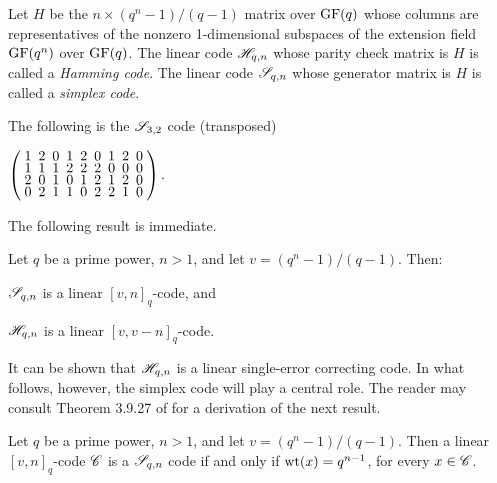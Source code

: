 \documentclass[../../../main]{subfiles}
\begin{document}
\begin{defin}\label{hamming-code}\label{hamming-simplex-def}
  Let $H$ be the $n \times (q^n-1)/(q-1)$ matrix over $\text{GF}(q)$ whose columns are representatives of the nonzero 1-dimensional subspaces of the extension field $\text{GF}(q^n)$ over $\text{GF}(q)$. The linear code $\mathscr{H}_{q,n}$ whose parity check matrix is $H$ is called a {\it Hamming code}. The linear code $\mathscr{S}_{q,n}$ whose generator matrix is $H$ is called a {\it simplex code}.
\end{defin}

\begin{ex}
  The following is the $\mathscr{S}_{3,2}$ code (transposed)
  \begin{defenum}
  \item $
    \left(
      \arraycolsep=2.5pt\def\arraystretch{0.625}
      \begin{array}{ccccccccc}
        1&2&0&1&2&0&1&2&0\\
        1&1&1&2&2&2&0&0&0\\
        2&0&1&0&1&2&1&2&0\\
        0&2&1&1&0&2&2&1&0\\
      \end{array}
    \right).
    $
  \end{defenum}
\end{ex}

The following result is immediate.

\begin{prop}
  Let $q$ be a prime power, $n > 1$, and let $v=(q^n-1)/(q-1)$. Then:
  \begin{defenum}
  \item $\mathscr{S}_{q,n}$ is a linear $[v,n]_q$-code, and
  \item $\mathscr{H}_{q,n}$ is a linear $[v,v-n]_q$-code.
  \end{defenum}
\end{prop}

It can be shown that $\mathscr{H}_{q,n}$ is a linear
single-error correcting code. In what follows, however, the simplex code will
play a central role. The reader may consult Theorem 3.9.27 of
\cite{combinatorics-of-symmetric-designs} for a derivation of the next result.

\begin{thm}\label{simplex-properties}
  Let $q$ be a prime power, $n>1$, and let $v=(q^n-1)/(q-1)$. Then a linear $[v,n]_q$-code $\mathscr{C}$ is a $\mathscr{S}_{q,n}$ code if and only if $\text{wt}(x)=q^{n-1}$, for every $x \in \mathscr{C}$.
\end{thm}

\biblio
\end{document}
